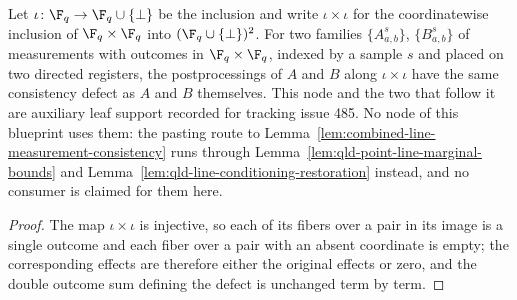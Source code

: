 \begin{lemma}
	\label{lem:qld-completed-point-answers}
	\leanok
	Let $\iota \colon \F_q \to \F_q \cup \{\bot\}$ be the inclusion and write
	$\iota \times \iota$ for the coordinatewise inclusion of
	$\F_q \times \F_q$ into $(\F_q \cup \{\bot\})^2$. For two families
	$\{A^s_{a,b}\}$, $\{B^s_{a,b}\}$ of measurements with outcomes in
	$\F_q \times \F_q$, indexed by a sample $s$ and placed on two directed
	registers, the postprocessings of $A$ and $B$ along $\iota \times \iota$
	have the same consistency defect as $A$ and $B$ themselves.
	This node and the two that follow it are auxiliary leaf support recorded
	for tracking issue 485. No node of this blueprint uses them: the pasting
	route to Lemma~\ref{lem:combined-line-measurement-consistency} runs
	through Lemma~\ref{lem:qld-point-line-marginal-bounds} and
	Lemma~\ref{lem:qld-line-conditioning-restoration} instead, and
	no consumer is claimed for them here.
\end{lemma}
\begin{proof}
	\leanok
	The map $\iota \times \iota$ is injective, so each of its fibers over a
	pair in its image is a single outcome and each fiber over a pair with an
	absent coordinate is empty; the corresponding effects are therefore either
	the original effects or zero, and the double outcome sum defining the
	defect is unchanged term by term.
\end{proof}


